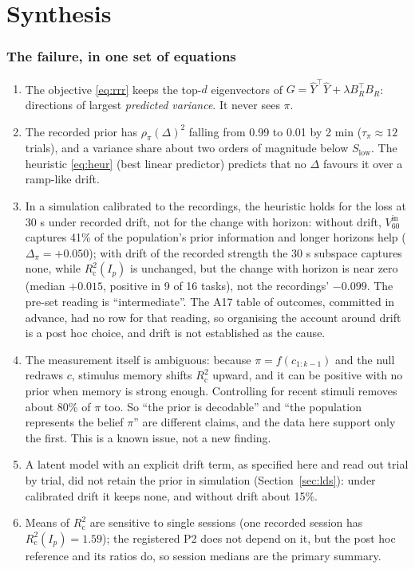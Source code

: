 \documentclass[11pt]{article}
\newcommand{\Rc}{R^2_{\mathrm{c}}}
\begin{document}
\part{Synthesis}

\section{The failure, in one set of equations}
\label{sec:synthesis}

\begin{enumerate}
\item The objective \eqref{eq:rrr} keeps the top-$d$ eigenvectors of $G = \hat Y^\top \hat Y + \lambda B_R^\top B_R$:
  directions of largest \emph{predicted variance}. It never sees $\pi$.
\item The recorded prior has $\rho_\pi(\Delta)^2$ falling from 0.99 to 0.01 by 2 min ($\tau_\pi \approx 12$ trials),
  and a variance share about two orders of magnitude below $S_{\mathrm{low}}$. The heuristic \eqref{eq:heur} (best
  linear predictor) predicts that no $\Delta$ favours it over a ramp-like drift.
\item In a simulation calibrated to the recordings, the heuristic holds for the loss at 30 s under recorded drift,
  not for the change with horizon: without drift, $V^{\mathrm{in}}_{60}$ captures 41\% of the population's prior
  information and longer horizons help ($\Delta_\pi = +0.050$); with drift of the recorded strength the 30 s subspace
  captures none, while $\Rc(I_p)$ is unchanged, but the change with horizon is near zero (median $+0.015$, positive in
  9 of 16 tasks), not the recordings' $-0.099$. The pre-set reading is ``intermediate''. The A17 table of outcomes,
  committed in advance, had no row for that reading, so organising the account around drift is a post hoc choice, and
  drift is not established as the cause.
\item The measurement itself is ambiguous: because $\pi = f(c_{1:k-1})$ and the null redraws $c$, stimulus memory
  shifts $\Rc$ upward, and it can be positive with no prior when memory is strong enough. Controlling for recent
  stimuli removes about 80\% of $\pi$ too. So ``the prior is decodable'' and ``the population represents the belief
  $\pi$'' are different claims, and the data here support only the first. This is a known issue, not a new finding.
\item A latent model with an explicit drift term, as specified here and read out trial by trial, did not retain the
  prior in simulation (Section~\ref{sec:lds}): under calibrated drift it keeps none, and without drift about 15\%.
\item Means of $\Rc$ are sensitive to single sessions (one recorded session has $\Rc(I_p) = 1.59$); the registered P2
  does not depend on it, but the post hoc reference and its ratios do, so session medians are the primary summary.
\end{enumerate}
\end{document}

